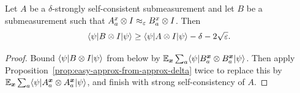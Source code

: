 \begin{lemma}\label{prop:completeness-transfer-self-consistent-A}
	\leanok
	Let $A$ be a $\delta$-strongly self-consistent submeasurement and let $B$ be a submeasurement such that $A_a^x \otimes I \approx_\varepsilon B_a^x \otimes I$. Then
	\[
		\langle \psi \rvert B \otimes I \lvert \psi \rangle \ge \langle \psi \rvert A \otimes I \lvert \psi \rangle - \delta - 2\sqrt{\varepsilon}.
	\]
\end{lemma}
\begin{proof}
	\leanok
	Bound $\langle \psi \rvert B \otimes I \lvert \psi \rangle$ from below by $\mathbb{E}_{{\boldsymbol{x}}}\sum_a \langle \psi \rvert B^{\boldsymbol{x}}_a \otimes B^{\boldsymbol{x}}_a \lvert \psi \rangle$. Then apply Proposition~\ref{prop:easy-approx-from-approx-delta} twice to replace this by $\mathbb{E}_{{\boldsymbol{x}}}\sum_a \langle \psi \rvert A^{\boldsymbol{x}}_a \otimes A^{\boldsymbol{x}}_a \lvert \psi \rangle$, and finish with strong self-consistency of $A$.
\end{proof}

